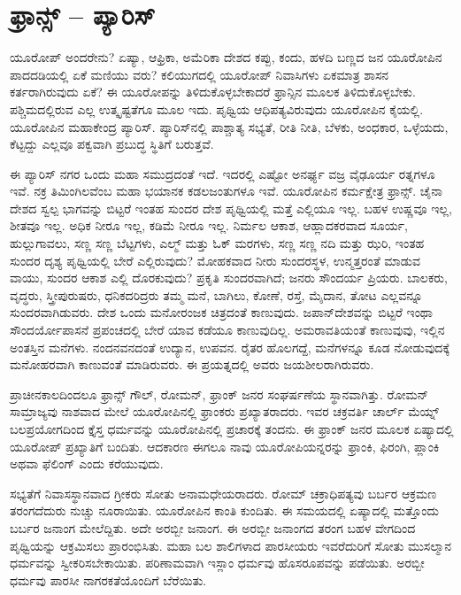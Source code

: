 \section{ಫ್ರಾನ್ಸ್ – ಪ್ಯಾರಿಸ್}

ಯೂರೋಪ್​ ಅಂದರೇನು? ಏಷ್ಯಾ, ಆಫ್ರಿಕಾ, ಅಮೆರಿಕಾ ದೇಶದ ಕಪ್ಪು, ಕಂದು, ಹಳದಿ ಬಣ್ಣದ ಜನ ಯೂರೋಪಿನ ಪಾದದಡಿಯಲ್ಲಿ ಏಕೆ ಮಣಿಯು ವರು? ಕಲಿಯುಗದಲ್ಲಿ ಯೂರೋಪ್​ ನಿವಾಸಿಗಳು ಏಕಮಾತ್ರ ಶಾಸನ ಕರ್ತರಾಗಿರುವುದು ಏಕೆ? ಈ ಯೂರೋಪನ್ನು ತಿಳಿದುಕೊಳ್ಳಬೇಕಾದರೆ ಫ್ರಾನ್ಸಿನ ಮೂಲಕ ತಿಳಿದುಕೊಳ್ಳಬೇಕು. ಪಶ್ಚಿಮದಲ್ಲಿರುವ ಎಲ್ಲ ಉತ್ಕೃಷ್ಟತೆಗೂ ಮೂಲ ಇದು. ಪೃಥ್ವಿಯ ಆಧಿಪತ್ಯವಿರುವುದು ಯೂರೋಪಿನ ಕೈಯಲ್ಲಿ. ಯೂರೋಪಿನ ಮಹಾಕೇಂದ್ರ ಪ್ಯಾರಿಸ್​. ಪ್ಯಾರಿಸ್​ನಲ್ಲಿ ಪಾಶ್ಚಾತ್ಯ ಸಭ್ಯತೆ, ರೀತಿ ನೀತಿ, ಬೆಳಕು, ಅಂಧಕಾರ, ಒಳ್ಳೆಯದು, ಕೆಟ್ಟದ್ದು ಎಲ್ಲವೂ ಪಕ್ವವಾಗಿ ಪ್ರಬುದ್ಧ ಸ್ಥಿತಿಗೆ ಬರುತ್ತವೆ.

ಈ ಪ್ಯಾರಿಸ್​ ನಗರ ಒಂದು ಮಹಾ ಸಮುದ್ರದಂತೆ ಇದೆ. ಇದರಲ್ಲಿ ಎಷ್ಟೋ ಅನರ್ಘ್ಯ ವಜ್ರ ವೈಢೂರ್ಯ ರತ್ನಗಳೂ ಇವೆ. ನಕ್ರ ತಿಮಿಂಗಿಲವೆಂಬ ಮಹಾ ಭಯಾನಕ ಕಡಲಜಂತುಗಳೂ ಇವೆ. ಯೂರೋಪಿನ ಕರ್ಮಕ್ಷೇತ್ರ ಫ್ರಾನ್ಸ್​. ಚೈನಾ ದೇಶದ ಸ್ವಲ್ಪ ಭಾಗವನ್ನು ಬಿಟ್ಟರೆ ಇಂತಹ ಸುಂದರ ದೇಶ ಪೃಥ್ವಿಯಲ್ಲಿ ಮತ್ತೆ ಎಲ್ಲಿಯೂ ಇಲ್ಲ. ಬಹಳ ಉಷ್ಣವೂ ಇಲ್ಲ, ಶೀತವೂ ಇಲ್ಲ. ಅಧಿಕ ನೀರೂ ಇಲ್ಲ, ಕಡಿಮೆ ನೀರೂ ಇಲ್ಲ. ನಿರ್ಮಲ ಆಕಾಶ, ಆಹ್ಲಾದಕರವಾದ ಸೂರ್ಯ, ಹುಲ್ಲುಗಾವಲು, ಸಣ್ಣ ಸಣ್ಣ ಬೆಟ್ಟಗಳು, ಎಲ್ಮ್​ ಮತ್ತು ಓಕ್​ ಮರಗಳು, ಸಣ್ಣ ಸಣ್ಣ ನದಿ ಮತ್ತು ಝರಿ, ಇಂತಹ ಸುಂದರ ದೃಶ್ಯ ಪೃಥ್ವಿಯಲ್ಲಿ ಬೇರೆ ಎಲ್ಲಿರುವುದು? ಮೋಹಕವಾದ ನೀರು ಸುಂದರಸ್ಥಳ, ಉನ್ಮತ್ತರಂತೆ ಮಾಡುವ ವಾಯು, ಸುಂದರ ಆಕಾಶ ಎಲ್ಲಿ ದೊರಕುವುದು? ಪ್ರಕೃತಿ ಸುಂದರವಾಗಿದೆ; ಜನರು ಸೌಂದರ್ಯ ಪ್ರಿಯರು. ಬಾಲಕರು, ವೃದ್ಧರು, ಸ್ತ್ರೀಪುರುಷರು, ಧನಿಕದರಿದ್ರರು ತಮ್ಮ ಮನೆ, ಬಾಗಿಲು, ಕೋಣೆ, ರಸ್ತೆ, ಮೈದಾನ, ತೋಟ ಎಲ್ಲವನ್ನೂ ಸುಂದರವಾಗಿಡುವರು. ದೇಶ ಒಂದು ಮನೋರಂಜಕ ಚಿತ್ರದಂತೆ ಕಾಣುವುದು. ಜಪಾನ್​ ದೇಶವನ್ನು ಬಿಟ್ಟರೆ ಇಂಥಾ ಸೌಂದರ್ಯೋಪಾಸನೆ ಪ್ರಪಂಚದಲ್ಲಿ ಬೇರೆ ಯಾವ ಕಡೆಯೂ ಕಾಣುವುದಿಲ್ಲ. ಅಮರಾವತಿಯಂತೆ ಕಾಣುವುವು, ಇಲ್ಲಿನ ಅಂತಸ್ತಿನ ಮನೆಗಳು. ನಂದನವನದಂತೆ ಉದ್ಯಾನ, ಉಪವನ. ರೈತರ ಹೊಲಗದ್ದೆ, ಮನೆಗಳನ್ನೂ ಕೂಡ ನೋಡುವುದಕ್ಕೆ ಮನೋಹರವಾಗಿ ಕಾಣುವಂತೆ ಮಾಡಿರುವರು. ಈ ಪ್ರಯತ್ನದಲ್ಲಿ ಅವರು ಜಯಶೀಲರಾಗಿರುವರು.

ಪ್ರಾಚೀನಕಾಲದಿಂದಲೂ ಫ್ರಾನ್ಸ್​ ಗೌಲ್​, ರೋಮನ್​, ಫ್ರಾಂಕ್​ ಜನರ ಸಂಘರ್ಷಣೆಯ ಸ್ಥಾನವಾಗಿತ್ತು. ರೋಮನ್​ ಸಾಮ್ರಾಜ್ಯವು ನಾಶವಾದ ಮೇಲೆ ಯೂರೋಪಿನಲ್ಲಿ ಫ್ರಾಂಕರು ಪ್ರಖ್ಯಾತರಾದರು. ಇವರ ಚಕ್ರವರ್ತಿ ಚಾರ್ಲ್​ ಮೆಯ್ನ್​ ಬಲಪ್ರಯೋಗದಿಂದ ಕ್ತೈಸ್ತ ಧರ್ಮವನ್ನು ಯೂರೋಪಿನಲ್ಲಿ ಪ್ರಚಾರಕ್ಕೆ ತಂದನು. ಈ ಫ್ರಾಂಕ್​ ಜನರ ಮೂಲಕ ಏಷ್ಯಾದಲ್ಲಿ ಯೂರೋಪ್​ ಪ್ರಖ್ಯಾತಿಗೆ ಬಂದಿತು. ಆದಕಾರಣ ಈಗಲೂ ನಾವು ಯೂರೋಪಿಯನ್ನರನ್ನು ಫ್ರಾಂಕಿ, ಫಿರಂಗಿ, ಪ್ಲಾಂಕಿ ಅಥವಾ ಫೆಲಿಂಗ್​ ಎಂದು ಕರೆಯುವುದು.

ಸಭ್ಯತೆಗೆ ನಿವಾಸಸ್ಥಾನವಾದ ಗ್ರೀಕರು ಸೋತು ಅನಾಮಧೇಯರಾದರು. ರೋಮ್​ ಚಕ್ರಾಧಿಪತ್ಯವು ಬರ್ಬರ ಆಕ್ರಮಣ ತರಂಗದೆದುರು ನುಚ್ಚು ನೂರಾಯಿತು. ಯೂರೋಪಿನ ಕಾಂತಿ ಕುಂದಿತು. ಈ ಸಮಯದಲ್ಲಿ ಏಷ್ಯಾದಲ್ಲಿ ಮತ್ತೊಂದು ಬರ್ಬರ ಜನಾಂಗ ಮೇಲೆದ್ದಿತು. ಅದೇ ಅರಬ್ಬೀ ಜನಾಂಗ. ಈ ಅರಬ್ಬೀ ಜನಾಂಗದ ತರಂಗ ಬಹಳ ವೇಗದಿಂದ ಪೃಥ್ವಿಯನ್ನು ಆಕ್ರಮಿಸಲು ಪ್ರಾರಂಭಿಸಿತು. ಮಹಾ ಬಲ ಶಾಲಿಗಳಾದ ಪಾರಸೀಯರು ಇವರೆದುರಿಗೆ ಸೋತು ಮುಸಲ್ಮಾನ ಧರ್ಮವನ್ನು ಸ್ವೀಕರಿಸಬೇಕಾಯಿತು. ಪರಿಣಾಮವಾಗಿ ಇಸ್ಲಾಂ ಧರ್ಮವು ಹೊಸರೂಪವನ್ನು ಪಡೆಯಿತು. ಅರಬ್ಬೀ ಧರ್ಮವು ಪಾರಸೀ ನಾಗರಕತೆಯೊಂದಿಗೆ ಬೆರೆಯಿತು.

